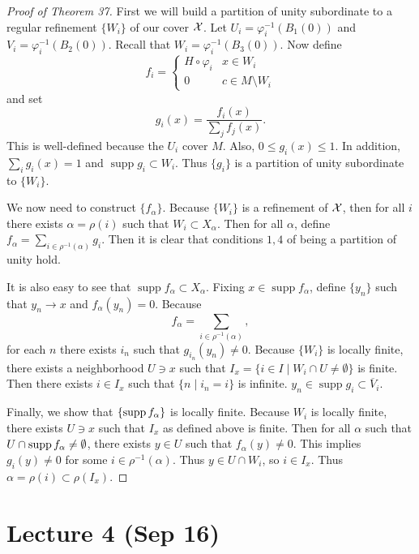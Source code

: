 \documentclass[twoside, 10pt]{article}
\begin{document}
    \begin{proof}[Proof of Theorem 37]
        First we will build a partition of unity subordinate to a regular refinement $\{W_i\}$ of our cover $\mathcal{X}$. Let $U_i = \varphi_i^{-1}(B_1(0))$ and $V_i = \varphi_i^{-1}(B_2(0))$. Recall that $W_i = \varphi_i^{-1}(B_3(0))$. Now define 
        \[f_i = \begin{cases}
            H \circ \varphi_i & x \in W_i \\
            0 & c \in M \setminus W_i
        \end{cases} \]
        and set \[g_i(x) = \frac{f_i(x)}{\sum_j f_j(x)}.\] This is well-defined because the $U_i$ cover $M$. Also, $0 \leq g_i(x) \leq 1$. In addition, $\sum_i g_i(x) = 1$ and $\operatorname{supp} g_i \subset W_i$. Thus $\{g_i\}$ is a partition of unity subordinate to $\{W_i\}$.

        We now need to construct $\{f_{\alpha}\}$. Because $\{W_i\}$ is a refinement of $\mathcal{X}$, then for all $i$ there exists $\alpha = \rho(i)$ such that $W_i \subset X_{\alpha}$. Then for all $\alpha$, define $f_{\alpha} = \sum_{i \in \rho^{-1}(\alpha)} g_i$. Then it is clear that conditions $1,4$ of being a partition of unity hold. 
        
        It is also easy to see that $\operatorname{supp} f_{\alpha} \subset X_{\alpha}$. Fixing $x \in \operatorname{supp} f_{\alpha}$, define $\{y_n\}$ such that $y_n \to x$ and $f_{\alpha}(y_n) = 0$. Because \[f_{\alpha} = \sum_{i\in \rho^{-1}(\alpha)},\] for each $n$ there exists $i_n$ such that $g_{i_n}(y_n) \neq 0$. Because $\{W_i\}$ is locally finite, there exists a neighborhood $U \ni x$ such that $I_x = \{i \in I \mid W_i \cap U \neq \emptyset\}$ is finite. Then there exists $i \in I_x$ such that $\{n \mid i_n = i\}$ is infinite. $y_n \in \operatorname{supp} g_i \subset \overline{V}_i$. 

        Finally, we show that $\{\operatorname{supp} f_{\alpha}\}$ is locally finite. Because $W_i$ is locally finite, there exists $U \ni x$ such that $I_x$ as defined above is finite. Then for all $\alpha$ such that $U \cap \operatorname{supp} f_{\alpha} \neq \emptyset$, there exists $y \in U$ such that $f_{\alpha}(y) \neq 0$. This implies $g_i(y) \neq 0$ for some $i \in \rho^{-1}(\alpha)$. Thus $y \in U \cap W_i$, so $i \in I_x$. Thus $\alpha = \rho(i) \subset \rho(I_x)$.
    \end{proof}

    \section{Lecture 4 (Sep 16)}%
    \label{sec:lecture_4_sep_16_}
\end{document}
